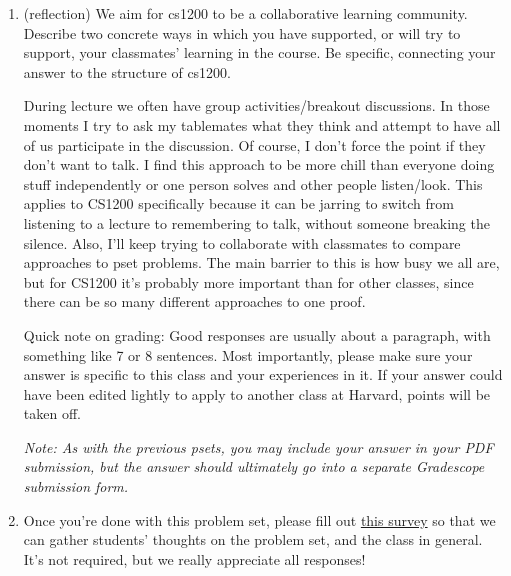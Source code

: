 \documentclass[11pt]{article}
\begin{document}
\begin{enumerate}
    \emph{Food for thought (do read - it's an important take-away from this problem):} This problem concerns size-augmented binary search trees. In lecture, we discussed AVL trees, which are balanced binary search trees where every vertex contains an additional \textit{height} attribute containing the length of the longest path from the vertex to a leaf (height-augmented). Additionally, every pair of siblings in the tree have heights differing by at most 1, so the tree is height-balanced. Note that if we augment a binary search tree both by size (as in the above problem) and by height (and use it to maintain the AVL property), then we create a dynamic data structure able to perform \texttt{search}, \texttt{insert}, and \texttt{select} all in time $O(\log n)$. 

\item (reflection) We aim for cs1200 to be a collaborative learning community. Describe two concrete ways in which you have supported, or will try to support, your classmates' learning in the course.  Be specific, connecting your answer to the structure of cs1200. 

\begin{mysolution}
	During lecture we often have group activities/breakout discussions. In those moments I try to ask my tablemates what they think and attempt to have all of us participate in the discussion. Of course, I don't force the point if they don't want to talk. I find this approach to be more chill than everyone doing stuff independently or one person solves and other people listen/look. This applies to CS1200 specifically because it can be jarring to switch from listening to a lecture to remembering to talk, without someone breaking the silence. Also, I'll keep trying to collaborate with classmates to compare approaches to pset problems. The main barrier to this is how busy we all are, but for CS1200 it's probably more important than for other classes, since there can be so many different approaches to one proof.
\end{mysolution}


Quick note on grading: Good responses are usually about a paragraph, with something like 7 or 8 sentences. Most importantly, please make sure your answer is specific to this class and your experiences in it. If your answer could have been edited lightly to apply to another class at Harvard, points will be taken off.

\textit{Note: As with the previous psets, you may include your answer in your PDF submission, but the answer should ultimately go into a separate Gradescope submission form.}
\item Once you're done with this problem set, please fill out \href{https://forms.gle/WzgUXMHuRKFV4L8t6}{this survey} so that we can gather students' thoughts on the problem set, and the class in general. It's not required, but we really appreciate all responses!

\end{enumerate}
\end{document}
